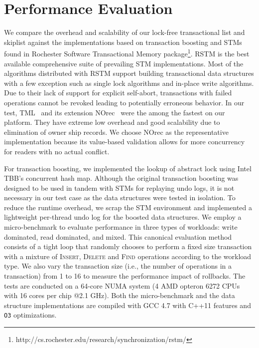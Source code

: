 \documentclass[]{sig-alternate-05-2015}
\begin{document}
\section{Performance Evaluation}
\label{sec:experiment}
We compare the overhead and scalability of our lock-free transactional list and skiplist against the implementations based on transaction boosting and STMs found in Rochester Software Transactional Memory package\footnote{http://cs.rochester.edu/research/synchronization/rstm/}.
RSTM is the best available comprehensive suite of prevailing STM implementations.
Most of the algorithms distributed with RSTM support building transactional data structures with a few exception such as single lock algorithms and in-place write algorithms. 
Due to their lack of support for explicit self-abort, transactions with failed operations cannot be revoked leading to potentially erroneous behavior.  
In our test, TML~\cite{dalessandro2010norec} and its extension NOrec~\cite{dalessandro2010norec} were the among the fastest on our platform.
They have extreme low overhead and good scalability due to elimination of owner ship records.
We choose NOrec as the representative implementation because its value-based validation allows for more concurrency for readers with no actual conflict.

For transaction boosting, we implemented the lookup of abstract lock using Intel TBB's concurrent hash map.
Although the original transaction boosting was designed to be used in tandem with STMs for replaying undo logs, it is not necessary in our test case as the data structures were tested in isolation.
To reduce the runtime overhead, we scrap the STM environment and implemented a lightweight per-thread undo log for the boosted data structures.
We employ a micro-benchmark to evaluate performance in three types of workloads: write dominated, read dominated, and mixed.
This canonical evaluation method~\cite{dalessandro2010norec,harris2001pragmatic} consists of a tight loop that randomly chooses to perform a fixed size transaction with a mixture of \textsc{Insert}, \textsc{Delete} and \textsc{Find} operations according to the workload type.
We also vary the transaction size (i.e., the number of operations in a transaction) from 1 to 16 to measure the performance impact of rollbacks.
The tests are conducted on a 64-core NUMA system (4 AMD opteron 6272 CPUs with 16 cores per chip @2.1 GHz). 
Both the micro-benchmark and the data structure implementations are compiled with GCC 4.7 with C++11 features and \texttt{O3} optimizations.
\end{document}
